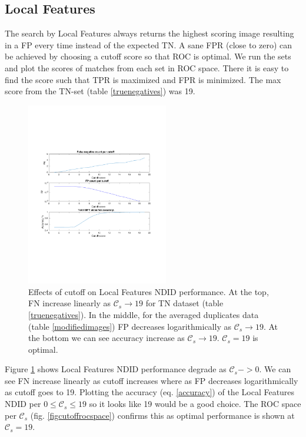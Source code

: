 \documentclass[english,12pt,a4paper,pdftex,elec,utf8]{aaltothesis}
\begin{document}
\subsection{Local Features}
The search by Local Features always returns the highest scoring image resulting in a FP every time instead of the expected TN. A sane FPR (close to zero) can be achieved by choosing a cutoff score so that ROC is optimal. We run the sets and plot the scores of matches from each set in ROC space. There it is easy to find the score such that TPR is maximized and FPR is minimized. The max score from the TN-set (table \ref{truenegatives}) was 19.

\begin{figure}[htb]
\begin{center}
\includegraphics[height=8cm]{figures/SIFTCountROC}
\end{center}
\caption{ Effects of cutoff on Local Features NDID performance. At the top, FN increase linearly as $\mathcal{C}_s \rightarrow 19$ for TN dataset (table \ref{truenegatives}). In the middle, for the averaged duplicates data (table \ref{modifiedimages}) FP decreases logarithmically as $\mathcal{C}_s \rightarrow 19$. At the bottom we can see accuracy increase as $\mathcal{C}_s \rightarrow 19$. $\mathcal{C}_s=19$ is optimal.}
\label{figcutoff}
\end{figure}

Figure \ref{figcutoff} shows Local Features NDID performance degrade as $\mathcal{C}_{s}->0$. We can see FN increase linearly as cutoff increases where as FP decreases logarithmically as cutoff goes to 19. Plotting the accuracy (eq. \ref{accuracy}) of the Local Features NDID per $0 \leq \mathcal{C}_{s} \leq 19$ so it looks like 19 would be a good choice. The ROC space per $\mathcal{C}_s$ (fig. \ref{figcutoffrocspace}) confirms this as optimal performance is shown at $\mathcal{C}_s=19$.
\end{document}
